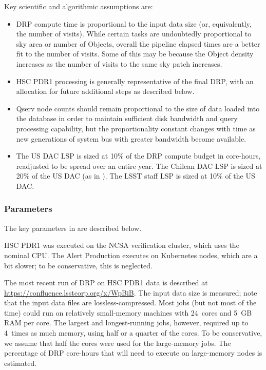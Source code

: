 Key scientific and algorithmic assumptions are:
\begin{itemize}
\item DRP compute time is proportional to the input data size (or, equivalently, the number of visits).
While certain tasks are undoubtedly proportional to sky area or number of Objects, overall the pipeline elapsed times are a better fit to the number of visits.
Some of this may be because the Object density increases as the number of visits to the same sky patch increases.
\item HSC PDR1 processing is generally representative of the final DRP, with an allocation for future additional steps as described below.
\item Qserv node counts should remain proportional to the size of data loaded into the database in order to maintain sufficient disk bandwidth and query processing capability, but the proportionality constant changes with time as new generations of system bus with greater bandwidth become available.
\item The US DAC LSP is sized at 10\% of the DRP compute budget in core-hours, readjusted to be spread over an entire year.
The Chilean DAC LSP is sized at 20\% of the US DAC (as in ).
The LSST staff LSP is sized at 10\% of the US DAC.
\end{itemize}

\subsubsection{Parameters}
The key parameters in  are described below.

HSC PDR1 was executed on the NCSA verification cluster, which uses the nominal CPU.
The Alert Production executes on Kubernetes nodes, which are a bit slower; to be conservative, this is neglected.

The most recent run of DRP on HSC PDR1 data is described at \url{https://confluence.lsstcorp.org/x/WpBiB}.
The input data size is measured; note that the input data files are lossless-compressed.
Most jobs (but not most of the time) could run on relatively small-memory machines with 24~cores and 5~GB RAM per core.
The largest and longest-running jobs, however, required up to 4~times as much memory, using half or a quarter of the cores.
To be conservative, we assume that half the cores were used for the large-memory jobs.
The percentage of DRP core-hours that will need to execute on large-memory nodes is estimated.

